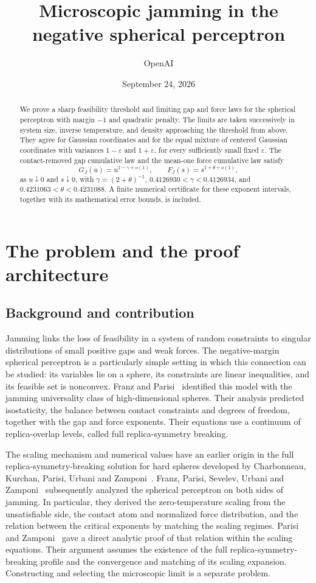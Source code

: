 \documentclass[11pt,a4paper]{article}
\title{Microscopic jamming in the negative spherical perceptron}
\author{OpenAI}
\date{September 24, 2026}
\numberwithin{equation}{section}
\theoremstyle{definition}
\theoremstyle{remark}
\newcommand{\eps}{\varepsilon}
\begin{document}
\maketitle
\begin{abstract}
We prove a sharp feasibility threshold and limiting gap and force laws for
the spherical perceptron with margin $-1$ and quadratic penalty. The limits
are taken successively in system size, inverse temperature, and density
approaching the threshold from above. They agree for Gaussian coordinates
and for the equal mixture of centered Gaussian coordinates with variances
$1-\eps$ and $1+\eps$, for every sufficiently small fixed $\eps$.
The contact-removed gap cumulative law and the mean-one force cumulative
law satisfy
\[
 G_J(u)=u^{1-\gamma+o(1)},\qquad F_J(s)=s^{1+\theta+o(1)},
\]
as $u\downarrow0$ and $s\downarrow0$, with $\gamma=(2+\theta)^{-1}$,
$0.4126930<\gamma<0.4126934$, and
$0.4231063<\theta<0.4231088$.
A finite numerical certificate for these exponent intervals, together with
its mathematical error bounds, is included.
\end{abstract}

\section{The problem and the proof architecture}\label{sec:introduction}

\subsection{Background and contribution}
Jamming links the loss of feasibility in a system of random constraints to
singular distributions of small positive gaps and weak forces.  The
negative-margin spherical perceptron is a particularly simple setting in
which this connection can be studied: its variables lie on a sphere, its
constraints are linear inequalities, and its feasible set is nonconvex.
Franz and Parisi~\cite{FranzParisi2016} identified this model with the
jamming universality class of high-dimensional spheres.  Their analysis
predicted isostaticity, the balance between contact constraints and degrees
of freedom, together with the gap and force exponents.  Their equations
use a continuum of replica-overlap levels, called full replica-symmetry
breaking.

The scaling mechanism and numerical values have an earlier origin in the
full replica-symmetry-breaking solution for hard spheres developed by
Charbonneau, Kurchan, Parisi, Urbani and Zamponi~\cite{CKPUZ2014}.
Franz, Parisi, Sevelev, Urbani and Zamponi~\cite{FPSUZ2017} subsequently
analyzed the spherical perceptron on both sides of jamming.  In particular,
they derived the zero-temperature scaling from the unsatisfiable side,
the contact atom and normalized force distribution, and the relation
between the critical exponents by matching the scaling regimes.
Parisi and Zamponi~\cite{ParisiZamponi2026} gave a direct analytic proof
of that relation within the scaling equations.  Their argument assumes the existence of the full replica-symmetry-breaking
profile and the convergence and matching of its scaling expansion.
Constructing and selecting the microscopic limit is a separate problem.
\end{document}
